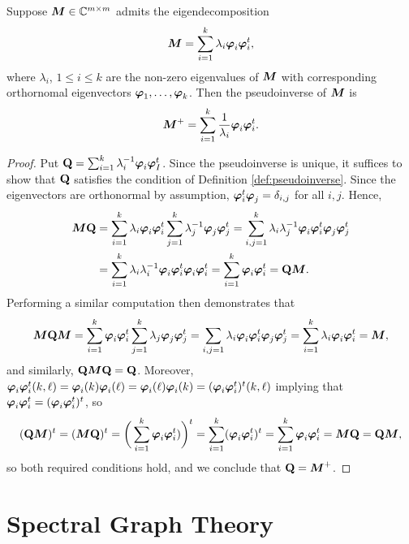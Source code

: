 \begin{lemma}
Suppose ${\vb*{M}}\in\mathbb{C}^{m\times m}$ admits the eigendecomposition 
\[{\vb*{M}}=\sum_{i=1}^k \lambda_i \vb*{\varphi}_i\vb*{\varphi}_i^t,\]
where $\lambda_i$, $1\leq i\leq k$ are the non-zero eigenvalues of ${\vb*{M}}$ with corresponding orthornomal eigenvectors $\vb*{\varphi}_1,\dots,\vb*{\varphi}_k$. Then the pseudoinverse of ${\vb*{M}}$ is 
\begin{equation}
    \label{eq:pseudoinverse}
    {\vb*{M}}^+=\sum_{i=1}^k \frac{1}{\lambda_i}\vb*{\varphi}_i\vb*{\varphi}_i^t.
\end{equation}
\end{lemma}
\begin{proof}
Put $\vb{Q}=\sum_{i=1}^k \lambda_i^{-1}\vb*{\varphi}_i\vb*{\varphi}_I^t$. Since the pseudoinverse is unique, it suffices to show that $\vb{Q}$ satisfies the condition of Definition \ref{def:pseudoinverse}.
Since the eigenvectors are orthonormal by assumption, $\vb*{\varphi}_i^t\vb*{\varphi}_j=\delta_{i,j}$ for all $i,j$. Hence,  
\begin{align*}
    {\vb*{M}}\vb{Q}&= \sum_{i=1}^k \lambda_i\vb*{\varphi}_i\vb*{\varphi}_i^t \sum_{j=1}^k \lambda_j^{-1}\vb*{\varphi}_j\vb*{\varphi}_j^t = \sum_{i,j=1}^k \lambda_i\lambda_j^{-1} \vb*{\varphi}_i\vb*{\varphi}_i^t \vb*{\varphi}_j\vb*{\varphi}_j^t \\
    &= \sum_{i=1}^k \lambda_i\lambda_i^{-1} \vb*{\varphi}_i\vb*{\varphi}_i^t\vb*{\varphi}_i\vb*{\varphi}_i^t 
    = \sum_{i=1}^k \vb*{\varphi}_i\vb*{\varphi}_i^t = \vb{Q}{\vb*{M}}.
\end{align*}
Performing a similar computation then demonstrates that 
\[{\vb*{M}}\vb{Q}{\vb*{M}} = \sum_{i=1}^k \vb*{\varphi}_i\vb*{\varphi}_i^t \sum_{j=1}^k \lambda_j\vb*{\varphi}_j\vb*{\varphi}_j^t=\sum_{i,j=1}\lambda_i \vb*{\varphi}_i\vb*{\varphi}_i^t\vb*{\varphi}_j\vb*{\varphi}_j^t=\sum_{i=1}^k \lambda_i \vb*{\varphi}_i\vb*{\varphi}_i^t ={\vb*{M}},\]
and similarly, $\vb{Q}{\vb*{M}}\vb{Q}=\vb{Q}$. Moreover, $\vb*{\varphi}_i\vb*{\varphi}_i^t (k,\ell)=\vb*{\varphi}_i(k)\vb*{\varphi}_i(\ell)=\vb*{\varphi}_i(\ell)\vb*{\varphi}_i(k)=(\vb*{\varphi}_i\vb*{\varphi}_i^t)^t (k,\ell)$ implying that $\vb*{\varphi}_i\vb*{\varphi}_i^t=(\vb*{\varphi}_i\vb*{\varphi}_i^t)^t$, so 
\[(\vb{Q}{\vb*{M}})^t=({\vb*{M}}\vb{Q})^t =\bigg(\sum_{i=1}^k \vb*{\varphi}_i\vb*{\varphi}_i^t )\bigg)^t = \sum_{i=1}^k (\vb*{\varphi}_i\vb*{\varphi}_i^t)^t = \sum_{i=1}^k \vb*{\varphi}_i\vb*{\varphi}_i^t={\vb*{M}}\vb{Q}=\vb{Q}{\vb*{M}},\]
so both required conditions hold, and we conclude that $\vb{Q}={\vb*{M}}^+$. 
\end{proof}



\section{Spectral Graph Theory}
\label{sec:background_spectral}

